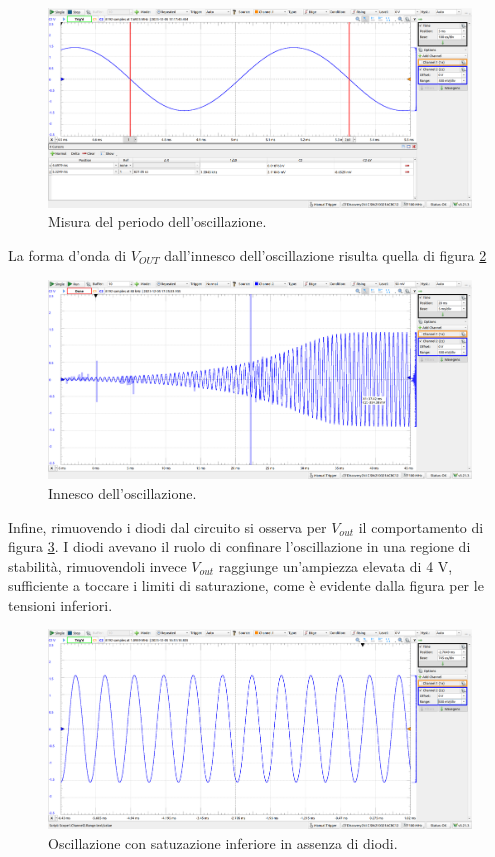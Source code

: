 \documentclass[10pt,a4paper]{article}
\begin{document}
\begin{figure}[h]
    \begin{center}
    \includegraphics[width=0.7\linewidth]{wyenperiodo.png}
    \caption{\small Misura del periodo dell'oscillazione.}
    \label{fig:wyenperiodo}
    \end{center}
\end{figure}

La forma d'onda di $V_{OUT}$ dall'innesco
dell'oscillazione risulta quella di figura \ref{fig:wieninnesco}
\begin{figure}[h]
    \begin{center}
    \includegraphics[width=0.7\linewidth]{wieninnesco.png}
    \caption{\small Innesco dell'oscillazione.}
    \label{fig:wieninnesco}
    \end{center}
\end{figure}

Infine, rimuovendo i diodi dal circuito si osserva per $V_{out}$ il comportamento di figura \ref{fig:wiensenzadiodi}. I diodi avevano il ruolo di confinare l'oscillazione in una regione di stabilità, rimuovendoli invece $V_{out}$ raggiunge un'ampiezza elevata di 4 V, sufficiente a toccare i limiti di saturazione, come è evidente dalla figura per le tensioni inferiori.
\begin{figure}[h]
    \begin{center}
    \includegraphics[width=0.7\linewidth]{wienosc1.png}
    \caption{\small Oscillazione con satuzazione inferiore in assenza di diodi.}
    \label{fig:wiensenzadiodi}
    \end{center}
\end{figure}
\end{document}
